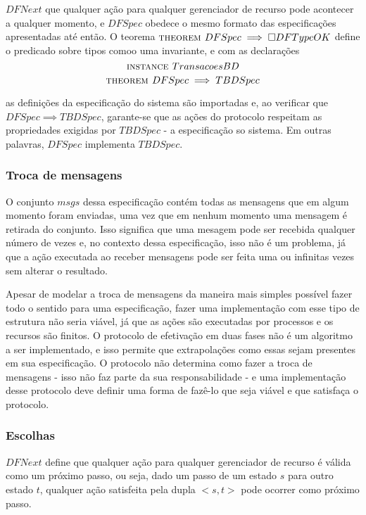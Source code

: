 $DFNext$ que qualquer ação para qualquer gerenciador de recurso pode acontecer a
qualquer momento, e $DFSpec$ obedece o mesmo formato das especificações
apresentadas até então. O teorema $\textsc{theorem } DFSpec \implies \square DFTypeOK$
define o predicado sobre tipos comoo uma invariante, e com as declarações
\[\textsc{instance } TransacoesBD\]
\[\textsc{theorem } DFSpec \implies TBDSpec\]

as definições da especificação do sistema são importadas e, ao verificar que
$DFSpec \implies TBDSpec$, garante-se que as ações do protocolo respeitam as
propriedades exigidas por $TBDSpec$ - a especificação so sistema. Em outras
palavras, $DFSpec$ implementa $TBDSpec$.


\subsubsection{Troca de mensagens}

O conjunto $msgs$ dessa especificação contém todas as mensagens que em algum
momento foram enviadas, uma vez que em nenhum momento uma mensagem é retirada do
conjunto. Isso significa que uma mesagem pode ser recebida qualquer número de
vezes e, no contexto dessa especificação, isso não é um problema, já que a ação
executada ao receber mensagens pode ser feita uma ou infinitas vezes sem alterar
o resultado.

Apesar de modelar a troca de mensagens da maneira mais simples possível fazer todo o sentido para uma especificação, fazer uma implementação com esse tipo de estrutura não seria viável, já que as ações são executadas por processos e os recursos são finitos. O protocolo de efetivação em duas fases não é um algoritmo a ser implementado, e isso permite que extrapolações como essas sejam presentes em sua especificação. O protocolo não determina como fazer a troca de mensagens - isso não faz parte da sua responsabilidade - e uma implementação desse protocolo deve definir uma forma de fazê-lo que seja viável e que satisfaça o protocolo.

\subsubsection{Escolhas}

$DFNext$ define que qualquer ação para qualquer gerenciador de recurso é válida
como um próximo passo, ou seja, dado um passo de um estado $s$ para outro
estado $t$, qualquer ação satisfeita pela dupla $<s, t>$ pode ocorrer como
próximo passo.

